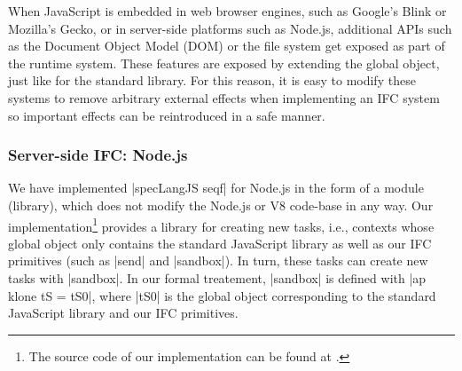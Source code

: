 When JavaScript is embedded in web browser engines, such as Google's
Blink or Mozilla's Gecko, or in server-side platforms such as Node.js,
additional APIs such as the Document Object Model (DOM) or the file
system get exposed as part of the runtime system.
These features are exposed by extending the global object, just like
for the standard library.  For this reason, it is easy to modify
these systems to remove arbitrary external effects when implementing
an IFC system so important effects can be reintroduced in a safe manner.


\subsubsection{Server-side IFC: Node.js}

We have implemented |specLangJS seqf| for Node.js in the form of a module
(library), which does not modify the Node.js or V8 code-base in any
way.
%
Our implementation\footnote{The source code of our implementation can be found at
  \codelink{}.} provides a library for creating new tasks, i.e.,
contexts whose global object only contains the standard JavaScript
library as well as our IFC primitives (such as |send| and |sandbox|).
%
In turn, these tasks can create new tasks with |sandbox|.
%
In our formal treatement, |sandbox| is defined with |ap klone tS = tS0|,
where |tS0| is the global object corresponding to the standard
JavaScript library and our IFC primitives.
 
